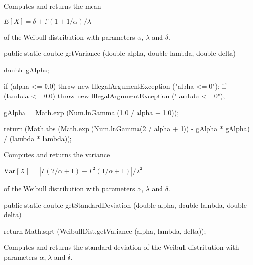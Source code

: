 \begin{tabb}  Computes and returns the mean
\begin{latexonly}
   $E[X] = \delta + \Gamma(1 + 1/\alpha)/\lambda$
\end{latexonly}
   of the Weibull distribution with parameters $\alpha$, $\lambda$ and $\delta$.
\end{tabb}
\begin{htmlonly}
\end{htmlonly}
\begin{code}

   public static double getVariance (double alpha, double lambda,
                                     double delta)\begin{hide} {
      double gAlpha;

      if (alpha <= 0.0)
        throw new IllegalArgumentException ("alpha <= 0");
      if (lambda <= 0.0)
        throw new IllegalArgumentException ("lambda <= 0");

      gAlpha = Math.exp (Num.lnGamma (1.0 / alpha + 1.0));

      return (Math.abs (Math.exp (Num.lnGamma(2 / alpha + 1)) - gAlpha * gAlpha) / (lambda * lambda));
   }\end{hide}
\end{code}
\begin{tabb}  Computes and returns the variance
\begin{latexonly}
   $\mbox{Var}[X] = | \Gamma(2/\alpha + 1) - \Gamma^2(1/\alpha + 1) | /\lambda^2$
\end{latexonly}
   of the Weibull distribution with parameters $\alpha$, $\lambda$ and $\delta$.
\end{tabb}
\begin{htmlonly}
\end{htmlonly}
\begin{code}

   public static double getStandardDeviation (double alpha, double lambda,
                                              double delta)\begin{hide} {
      return Math.sqrt (WeibullDist.getVariance (alpha, lambda, delta));
   }\end{hide}
\end{code}
\begin{tabb}  Computes and returns the standard deviation
   of the Weibull distribution with parameters $\alpha$, $\lambda$ and $\delta$.
\end{tabb}
